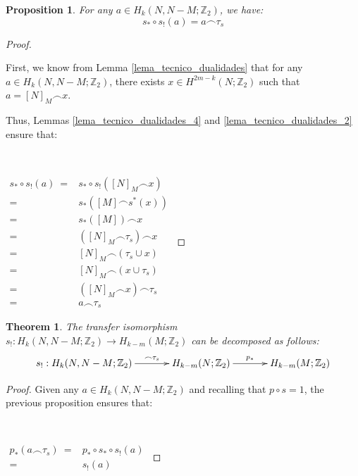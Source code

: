 \documentclass[12pt,oneside]{book}
\newtheorem{teo}    {Theorem}[chapter]
\newtheorem{prop}   {Proposition}[chapter]
\newcommand{\Z}{\mathbb{Z}}
\newcommand{\ccap}{\frown}
\begin{document}
    \begin{prop}
    	For any $a \in H_{k}(N, N - M; \Z_{2})$, we have:
    	$$ s_{*} \circ s_{!}(a) = a \ccap \tau_{s} $$
    \end{prop}
    \begin{proof}

        \

    	First, we know from Lemma \ref{lema_tecnico_dualidades} that for any $a \in H_{k}(N, N - M; \Z_{2})$, there exists 
        $x \in H^{2m - k}(N; \Z_{2})$ such that $a = [N]_{M} \ccap x$.

    	Thus, Lemmas \ref{lema_tecnico_dualidades_4} and \ref{lema_tecnico_dualidades_2} ensure that:

        \

    	$\begin{array}{rl}
    		s_{*} \circ s_{!}(a) \ = & s_{*} \circ s_{!}([N]_{M} \ccap x) \\
    		= & s_{*}([M] \ccap s^{*}(x)) \\
    		= & s_{*}([M]) \ccap x \\
    		= & \left( [N]_{M} \ccap \tau_{s} \right) \ccap x \\
    		= & [N]_{M} \ccap \left( \tau_{s} \cup x \right) \\
    		= & [N]_{M} \ccap \left( x \cup \tau_{s} \right) \\
    		= & \left( [N]_{M} \ccap x \right) \ccap \tau_{s} \\
    		= & a \ccap \tau_{s}
    	\end{array}$

    \end{proof}

    \begin{teo}
        The transfer isomorphism $s_{!}: H_{k}(N, N - M; \Z_{2}) \to H_{k - m}(M; \Z_{2})$ can be decomposed as 
        follows:
        $$ \xymatrix @C=0.5cm {
        	s_{!}: H_{k}(N, N - M; \Z_{2}) \ar[rr]^-{\ccap \tau_{s}} && H_{k - m}(N; \Z_{2}) \ar[rr]^-{p_{*}} && H_{k - m}(M; \Z_{2})
        } $$
    \end{teo}

    \begin{proof}

        Given any $a \in H_{k}(N, N - M; \Z_{2})$ and recalling that $p \circ s = 1$, the previous proposition ensures that:

        \

        $\begin{array}{rl}
        	p_{*}(a \ccap \tau_{s}) \ = & p_{*} \circ s_{*} \circ s_{!}(a) \\
        	= & s_{!}(a)
        \end{array}$

    \end{proof}
\end{document}
